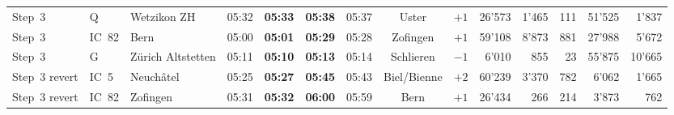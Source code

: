 \documentclass[preprint,12pt]{elsarticle}
\begin{document}
\begin{table}[!htb]
{\begin{tabular}{lllcccccrrrrrr}
Step~3 & Q & Wetzikon ZH & 05:32 & \textbf{05:33} & \textbf{05:38} & 05:37 & Uster & \(+1\) & 26'573 & 1'465 & 111 & 51'525 & 1'837 \\
Step~3 & IC~82 & Bern & 05:00 & \textbf{05:01} & \textbf{05:29} & 05:28 & Zofingen & \(+1\) & 59'108 & 8'873 & 881 & 27'988 & 5'672 \\
Step~3 & G & Zürich Altstetten & 05:11 & \textbf{05:10} & \textbf{05:13} & 05:14 & Schlieren & \(-1\) & 6'010 & 855 & 23 & 55'875 & 10'665 \\
\midrule
\rowcolor{black!8}
Step~3 revert & IC~5 & Neuchâtel & 05:25 & \textbf{05:27} & \textbf{05:45} & 05:43 & Biel/Bienne & \(+2\) & 60'239 & 3'370 & 782 & 6'062 & 1'665 \\
\rowcolor{black!8}
Step~3 revert & IC~82 & Zofingen & 05:31 & \textbf{05:32} & \textbf{06:00} & 05:59 & Bern & \(+1\) & 26'434 & 266 & 214 & 3'873 & 762 \\
\bottomrule
\end{tabular}%
}
\end{table}

\end{document}
